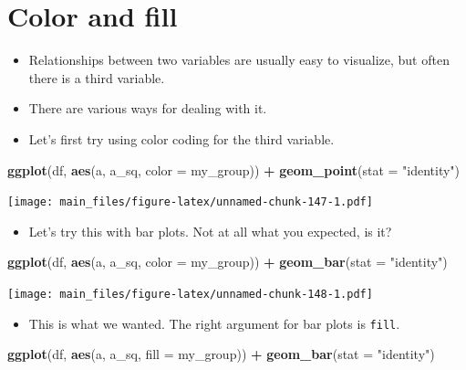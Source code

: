 \documentclass[
]{book}
\newenvironment{Shaded}{\begin{snugshade}}{\end{snugshade}}
\newcommand{\AttributeTok}[1]{\textcolor[rgb]{0.13,0.29,0.53}{#1}}
\newcommand{\FunctionTok}[1]{\textcolor[rgb]{0.13,0.29,0.53}{\textbf{#1}}}
\newcommand{\NormalTok}[1]{#1}
\newcommand{\SpecialCharTok}[1]{\textcolor[rgb]{0.81,0.36,0.00}{\textbf{#1}}}
\newcommand{\StringTok}[1]{\textcolor[rgb]{0.31,0.60,0.02}{#1}}
\providecommand{\tightlist}{%
  \setlength{\itemsep}{0pt}\setlength{\parskip}{0pt}}
\begin{document}
\hypertarget{color-and-fill}{%
\section{Color and fill}\label{color-and-fill}}

\begin{itemize}
\item
  Relationships between two variables are usually easy to visualize, but often there is a third variable.
\item
  There are various ways for dealing with it.
\item
  Let's first try using color coding for the third variable.
\end{itemize}

\begin{Shaded}
\begin{Highlighting}[]
\FunctionTok{ggplot}\NormalTok{(df, }\FunctionTok{aes}\NormalTok{(a, a\_sq, }\AttributeTok{color =}\NormalTok{ my\_group)) }\SpecialCharTok{+} \FunctionTok{geom\_point}\NormalTok{(}\AttributeTok{stat =} \StringTok{"identity"}\NormalTok{)}
\end{Highlighting}
\end{Shaded}

\texttt{[image: main\_files/figure-latex/unnamed-chunk-147-1.pdf]}

\begin{itemize}
\tightlist
\item
  Let's try this with bar plots. Not at all what you expected, is it?
\end{itemize}

\begin{Shaded}
\begin{Highlighting}[]
\FunctionTok{ggplot}\NormalTok{(df, }\FunctionTok{aes}\NormalTok{(a, a\_sq, }\AttributeTok{color =}\NormalTok{ my\_group)) }\SpecialCharTok{+} \FunctionTok{geom\_bar}\NormalTok{(}\AttributeTok{stat =} \StringTok{"identity"}\NormalTok{)}
\end{Highlighting}
\end{Shaded}

\texttt{[image: main\_files/figure-latex/unnamed-chunk-148-1.pdf]}

\begin{itemize}
\tightlist
\item
  This is what we wanted. The right argument for bar plots is \texttt{fill}.
\end{itemize}

\begin{Shaded}
\begin{Highlighting}[]
\FunctionTok{ggplot}\NormalTok{(df, }\FunctionTok{aes}\NormalTok{(a, a\_sq, }\AttributeTok{fill =}\NormalTok{ my\_group)) }\SpecialCharTok{+} \FunctionTok{geom\_bar}\NormalTok{(}\AttributeTok{stat =} \StringTok{"identity"}\NormalTok{)}
\end{Highlighting}
\end{Shaded}
\end{document}
